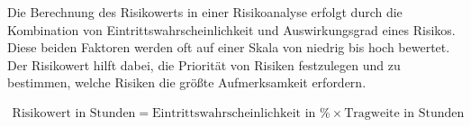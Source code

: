 Die Berechnung des Risikowerts in einer Risikoanalyse erfolgt durch die Kombination von Eintrittswahrscheinlichkeit und Auswirkungsgrad eines Risikos. Diese beiden Faktoren werden oft auf einer Skala von niedrig bis hoch bewertet. Der Risikowert hilft dabei, die Priorität von Risiken festzulegen und zu bestimmen, welche Risiken die größte Aufmerksamkeit erfordern.

\begin{align}
    \text{Risikowert in Stunden} = \text{Eintrittswahrscheinlichkeit in \%}\times \text{Tragweite in Stunden}
\end{align}








